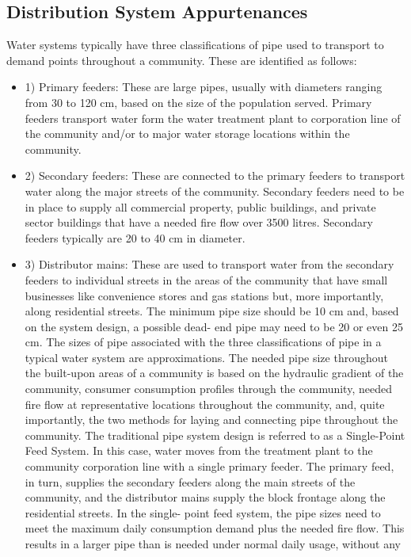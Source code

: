 \begin{itemize}
\section{Distribution System Appurtenances}
Water systems typically have three classifications of pipe used to transport to demand points 
throughout a community. These are identified as follows:
\bigbreak
\begin{itemize}
	\item 1) Primary feeders: These are large pipes, usually with diameters ranging from 30 to 120 cm, based on the size of the population served. Primary feeders transport water form the water treatment plant to corporation line of the community and/or to major water storage locations within the community.
	\item 2) Secondary feeders: These are connected to the primary feeders to transport water along the 
major streets of the community. Secondary feeders need to be in place to supply all commercial 
property, public buildings, and private sector buildings that have a needed fire flow over 3500 
litres. Secondary feeders typically are 20 to 40 cm in diameter. 
	\item 3) Distributor mains: These are used to transport water from the secondary feeders to individual
streets in the areas of the community that have small businesses like convenience stores and gas 
stations but, more importantly, along residential streets. The minimum pipe size should be 10 cm
and, based on the system design, a possible dead- end pipe may need to be 20 or even 25 cm.
\bigbreak
The sizes of pipe associated with the three classifications of pipe in a typical water system are
approximations. The needed pipe size throughout the built-upon areas of a community is based on 
the hydraulic gradient of the community, consumer consumption profiles through the community, 
needed fire flow at representative locations throughout the community, and, quite importantly, 
the two methods for laying and connecting pipe throughout the community. The traditional pipe 
system design is referred to as a Single-Point Feed System. In this case, water moves from the 
treatment plant to the community corporation line with a single primary feeder. The primary feed,
in turn, supplies the secondary feeders along the main streets of the community, and the 
distributor mains supply the block frontage along the residential streets. In the single- point 
feed system, the pipe sizes need to meet the maximum daily consumption demand plus the needed 
fire flow. This results in a larger pipe than is needed under normal daily usage, without any 

\end{itemize}
\end{itemize}
